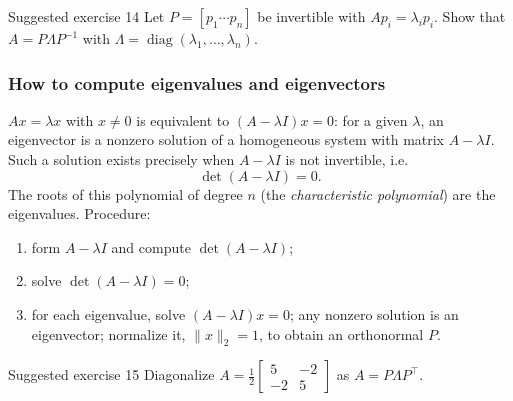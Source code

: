 \begin{Exercise}{Suggested exercise 14}{}
  Let $P = [p_1 \cdots p_n]$ be invertible with $Ap_i = \lambda_ip_i$. Show that $A = P\Lambda P^{-1}$ with
  $\Lambda = \operatorname{diag}(\lambda_1, \dots, \lambda_n)$.
\end{Exercise}


\subsubsection{How to compute eigenvalues and eigenvectors}

$Ax = \lambda x$ with $x \ne 0$ is equivalent to $(A - \lambda I)x = 0$: for a given $\lambda$, an eigenvector is a nonzero
solution of a homogeneous system with matrix $A - \lambda I$. Such a solution exists precisely when $A - \lambda I$ is not invertible, i.e.
\[
  \det(A - \lambda I) = 0.
\]
The roots of this polynomial of degree $n$ (the \emph{characteristic polynomial}) are the eigenvalues. Procedure:
\begin{enumerate}
  \item form $A - \lambda I$ and compute $\det(A - \lambda I)$;
  \item solve $\det(A - \lambda I) = 0$;
  \item for each eigenvalue, solve $(A - \lambda I)x = 0$; any nonzero solution is an eigenvector;
        normalize it, $\|x\|_2 = 1$, to obtain an orthonormal $P$.
\end{enumerate}


\begin{Exercise}{Suggested exercise 15}{}
  Diagonalize $A = \frac12\begin{bmatrix} 5 & -2 \\ -2 & 5 \end{bmatrix}$ as $A = P\Lambda P^\top$.
\end{Exercise}

